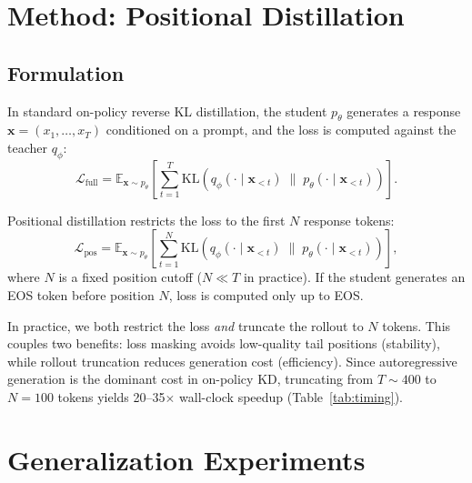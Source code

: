 \documentclass[10pt]{article}
\newcommand{\Method}{Positional distillation}
\newcommand{\KL}{\mathrm{KL}}
\begin{document}
\section{Method: Positional Distillation}
\label{sec:method}

\subsection{Formulation}

In standard on-policy reverse KL distillation, the student $p_\theta$ generates a response $\mathbf{x} = (x_1, \ldots, x_T)$ conditioned on a prompt, and the loss is computed against the teacher $q_\phi$:
\begin{equation}
\mathcal{L}_{\text{full}} = \mathbb{E}_{\mathbf{x} \sim p_\theta} \left[ \sum_{t=1}^{T} \KL\!\left(q_\phi(\cdot \mid \mathbf{x}_{<t}) \;\|\; p_\theta(\cdot \mid \mathbf{x}_{<t})\right) \right].
\label{eq:full_loss}
\end{equation}

\Method{} restricts the loss to the first $N$ response tokens:
\begin{equation}
\mathcal{L}_{\text{pos}} = \mathbb{E}_{\mathbf{x} \sim p_\theta} \left[ \sum_{t=1}^{N} \KL\!\left(q_\phi(\cdot \mid \mathbf{x}_{<t}) \;\|\; p_\theta(\cdot \mid \mathbf{x}_{<t})\right) \right],
\label{eq:pos_loss}
\end{equation}
where $N$ is a fixed position cutoff ($N \ll T$ in practice). If the student generates an EOS token before position $N$, loss is computed only up to EOS.

In practice, we both restrict the loss \emph{and} truncate the rollout to $N$ tokens. This couples two benefits: loss masking avoids low-quality tail positions (stability), while rollout truncation reduces generation cost (efficiency). Since autoregressive generation is the dominant cost in on-policy KD, truncating from $T{\sim}400$ to $N{=}100$ tokens yields 20--35$\times$ wall-clock speedup (Table~\ref{tab:timing}).


\section{Generalization Experiments}
\label{sec:experiments}
\end{document}
